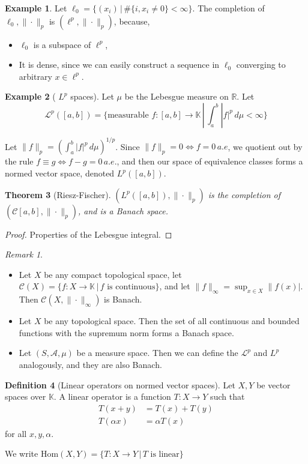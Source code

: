 \documentclass[10pt, oneside, reqno]{amsart}
\theoremstyle{plain}%
\newtheorem{thm}{Theorem}[section]
\theoremstyle{definition}
\newtheorem{defn}[thm]{Definition}
\newtheorem{exmp}[thm]{Example}
\theoremstyle{remark}
\newtheorem*{rem}{Remark}
\newcommand{\R}{\mathbb{R}}
\newcommand{\K}{\mathbb{K}}
\begin{document}
\begin{exmp}
	Let $\ell_0 = \{ (x_i) \, | \, \# \{ i, x_i \neq 0 \} < \infty \}$.  The completion of $\ell_0, \| \cdot \|_p$ is $(\ell^p, \| \cdot \|_p )$, because,
	\begin{itemize}
		\item $\ell_0$ is a subspace of $\ell^p$,
		\item It is dense, since we can easily construct a sequence in $\ell_0$ converging to arbitrary $x \in \ell^p$.
	\end{itemize}
\end{exmp}
\begin{exmp}[ $L^p$ spaces]
	Let $\mu$ be the Lebesgue measure on $\R$.  Let \[
		\mathcal{L}^p([a,b]) = \{ \text{measurable } f: [a,b] \rightarrow \K \, | \, \int_a^b |f|^p \, d \mu < \infty \}
	\]
	
	Let $\| f \|_p = \left( \int_a^b |f|^p \, d \mu \right)^{1/p}$.  Since $\| f \|_p = 0 \iff f = 0 \, a.e$, we quotient out by the rule $f \equiv g \iff f - g = 0 \, a.e.$, and then our space of equivalence classes forms a normed vector space, denoted $L^p([a,b])$.
\end{exmp}

\begin{thm}[Riesz-Fischer] $(L^p([a,b]), \| \cdot \|_p )$ is the completion of $(\mathcal{C}[a,b], \| \cdot \|_p )$, and is a Banach space.
\end{thm}
\begin{proof}
	Properties of the Lebesgue integral.
\end{proof}

\begin{rem}{\ }
	\begin{itemize}
		\item Let $X$ be any compact topological space, let $\mathcal{C}(X) = \{ f : X \rightarrow \K \, | \, \text{$f$ is continuous} \}$, and let $\|f \|_\infty = \sup_{x \in X} \|f(x)|$.  Then $\mathcal{C}(X, \| \cdot \|_\infty)$ is Banach.  
		\item Let $X$ be any topological space.  Then the set of all continuous and bounded functions with the supremum norm forms a Banach space.
		\item Let $(S, \mathcal{A}, \mu)$ be a measure space.  Then we can define the $\mathcal{L}^p$ and $L^p$ analogously, and they are also Banach.
	\end{itemize}
\end{rem}

\begin{defn}[Linear operators on normed vector spaces]
	Let $X,Y$ be vector spaces over $\K$.  A linear operator is a function $T:X \rightarrow Y$ such that 
	\begin{align*}
		T(x+y) &= T(x) + T(y) \\
		T(\alpha x) &= \alpha T(x)
	\end{align*}
	for all $x,y,\alpha$.

	We write $\text{Hom}(X,Y) = \{ T: X \rightarrow Y \, | \, \text{$T$ is linear} \}$
\end{defn}
\end{document}
